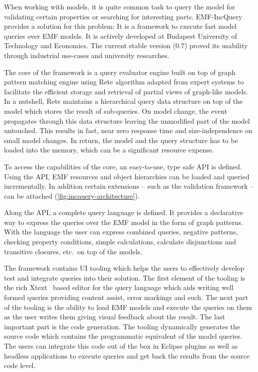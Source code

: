 


When working with models, it is quite common task to query the model for
validating certain properties or searching for interesting parts. EMF-IncQuery
\cite{EMFIncQuery} provides a solution for this problem: It is a framework to
execute fast model queries over EMF models. It is actively developed at Budapest
University of Technology and Economics. The current stable version (0.7) 
proved its usability through industrial use-cases
and university researches.

The core of the framework is a query evaluator engine built on top of graph
pattern matching engine using Rete algorithm adapted from expert
systems to facilitate the efficient storage and retrieval of partial views of
graph-like models. In a nutshell, Rete maintains a hierarchical query data
structure on top of the model which stores the result of sub-queries. On model
change, the event propagates through this data structure leaving the unmodified
part of the model untouched. This results in fast, near zero response time and
size-independence on small model changes. In return, the model and the query
structure has to be loaded into the memory, which can be a significant resource
expense.

To access the capabilities of the core, an easy-to-use, type safe API is
defined. Using the API, EMF resources and object hierarchies can be loaded and
queried incrementally. In addition certain extensions -- such as the validation
framework -- can be attached (\autoref{fig:incquery-architecture}).

Along the API, a complete query language is defined. It provides a declarative
way to express the queries over the EMF model in the form of graph patterns.
With the language the user can express combined queries, negative patterns,
checking property conditions, simple calculations, calculate disjunctions and
transitive closures, etc.~on top of the models.

The framework contains UI tooling which helps the users to effectively develop
test and integrate queries into their solution. The first element of the tooling
is the rich Xtext~\cite{XtextWeb} based editor for the query language which aids writing well
formed queries providing content assist, error markings and such. The next part
of the tooling is the ability to load EMF models and execute the queries on them
as the user writes them giving visual feedback about the result.
The last important part is the code generation. The tooling dynamically
generates the source code which contains the programmatic equivalent of the
model queries. The users can integrate this code out of the box in Eclipse
plugins as well as headless applications to execute queries and get back the
results from the source code level.

